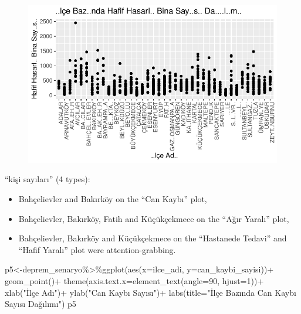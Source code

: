 \documentclass[
  11pt,
  a4paper,
  DIV=11,
  numbers=noendperiod]{scrartcl}
\newenvironment{Shaded}{\begin{snugshade}}{\end{snugshade}}
\newcommand{\AttributeTok}[1]{\textcolor[rgb]{0.40,0.45,0.13}{#1}}
\newcommand{\DecValTok}[1]{\textcolor[rgb]{0.68,0.00,0.00}{#1}}
\newcommand{\FunctionTok}[1]{\textcolor[rgb]{0.28,0.35,0.67}{#1}}
\newcommand{\NormalTok}[1]{\textcolor[rgb]{0.00,0.23,0.31}{#1}}
\newcommand{\OtherTok}[1]{\textcolor[rgb]{0.00,0.23,0.31}{#1}}
\newcommand{\SpecialCharTok}[1]{\textcolor[rgb]{0.37,0.37,0.37}{#1}}
\newcommand{\StringTok}[1]{\textcolor[rgb]{0.13,0.47,0.30}{#1}}
\begin{document}
\begin{figure}[H]

{\centering \includegraphics{project_files/figure-pdf/unnamed-chunk-3-4.pdf}

}

\end{figure}

``kişi sayıları'' (4 types):

\begin{itemize}
\item
  Bahçelievler and Bakırköy on the ``Can Kaybı'' plot,
\item
  Bahçelievler, Bakırköy, Fatih and Küçükçekmece on the ``Ağır Yaralı''
  plot,
\item
  Bahçelievler, Bakırköy and Küçükçekmece on the ``Hastanede Tedavi''
  and ``Hafif Yaralı'' plot were attention-grabbing.
\end{itemize}

\begin{Shaded}
\begin{Highlighting}[]
\NormalTok{p5}\OtherTok{\textless{}{-}}\NormalTok{deprem\_senaryo}\SpecialCharTok{\%\textgreater{}\%}\FunctionTok{ggplot}\NormalTok{(}\FunctionTok{aes}\NormalTok{(}\AttributeTok{x=}\NormalTok{ilce\_adi, }\AttributeTok{y=}\NormalTok{can\_kaybi\_sayisi))}\SpecialCharTok{+}
  \FunctionTok{geom\_point}\NormalTok{()}\SpecialCharTok{+}
  \FunctionTok{theme}\NormalTok{(}\AttributeTok{axis.text.x=}\FunctionTok{element\_text}\NormalTok{(}\AttributeTok{angle=}\DecValTok{90}\NormalTok{, }\AttributeTok{hjust=}\DecValTok{1}\NormalTok{))}\SpecialCharTok{+}
  \FunctionTok{xlab}\NormalTok{(}\StringTok{"İlçe Adı"}\NormalTok{)}\SpecialCharTok{+}
  \FunctionTok{ylab}\NormalTok{(}\StringTok{"Can Kaybı Sayısı"}\NormalTok{)}\SpecialCharTok{+}
  \FunctionTok{labs}\NormalTok{(}\AttributeTok{title=}\StringTok{"İlçe Bazında Can Kaybı Sayısı Dağılımı"}\NormalTok{)}
\NormalTok{p5}
\end{Highlighting}
\end{Shaded}
\end{document}
